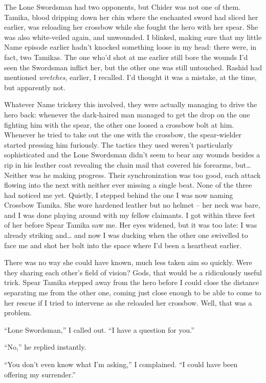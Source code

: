 \documentclass[12pt, openany]{book}
\begin{document}
The Lone Swordsman had two opponents, but Chider was not one of them. Tamika, blood dripping down her chin where the enchanted sword had sliced her earlier, was reloading her crossbow while she fought the hero with her spear. She was also white-veiled again, and unwounded. I blinked, making sure that my little Name episode earlier hadn’t knocked something loose in my head: there were, in fact, two Tamikas. The one who’d shot at me earlier still bore the wounds I’d seen the Swordsman inflict her, but the other one was still untouched. Rashid had mentioned \textit{wretches}, earlier, I recalled. I’d thought it was a mistake, at the time, but apparently not. 

Whatever Name trickery this involved, they were actually managing to drive the hero back: whenever the dark-haired man managed to get the drop on the one fighting him with the spear, the other one loosed a crossbow bolt at him. Whenever he tried to take out the one with the crossbow, the spear-wielder started pressing him furiously. The tactics they used weren’t particularly sophisticated and the Lone Swordsman didn’t seem to bear any wounds besides a rip in his leather coat revealing the chain mail that covered his forearms, but… Neither was he making progress. Their synchronization was too good, each attack flowing into the next with neither ever missing a single beat. None of the three had noticed me yet. Quietly, I stepped behind the one I was now naming Crossbow Tamika. She wore hardened leather but no helmet – her neck was bare, and I was done playing around with my fellow claimants. I got within three feet of her before Spear Tamika saw me. Her eyes widened, but it was too late: I was already striking and… and now I was ducking when the other one swivelled to face me and shot her bolt into the space where I’d been a heartbeat earlier.

There was no way she could have known, much less taken aim so quickly. Were they sharing each other’s field of vision? Gods, that would be a ridiculously useful trick. Spear Tamika stepped away from the hero before I could close the distance separating me from the other one, coming just close enough to be able to come to her rescue if I tried to intervene as she reloaded her crossbow. Well, that was a problem.

“Lone Swordsman,” I called out. “I have a question for you.”

“No,” he replied instantly.

“You don’t even know what I’m asking,” I complained. “I could have been offering my surrender.”
\end{document}
